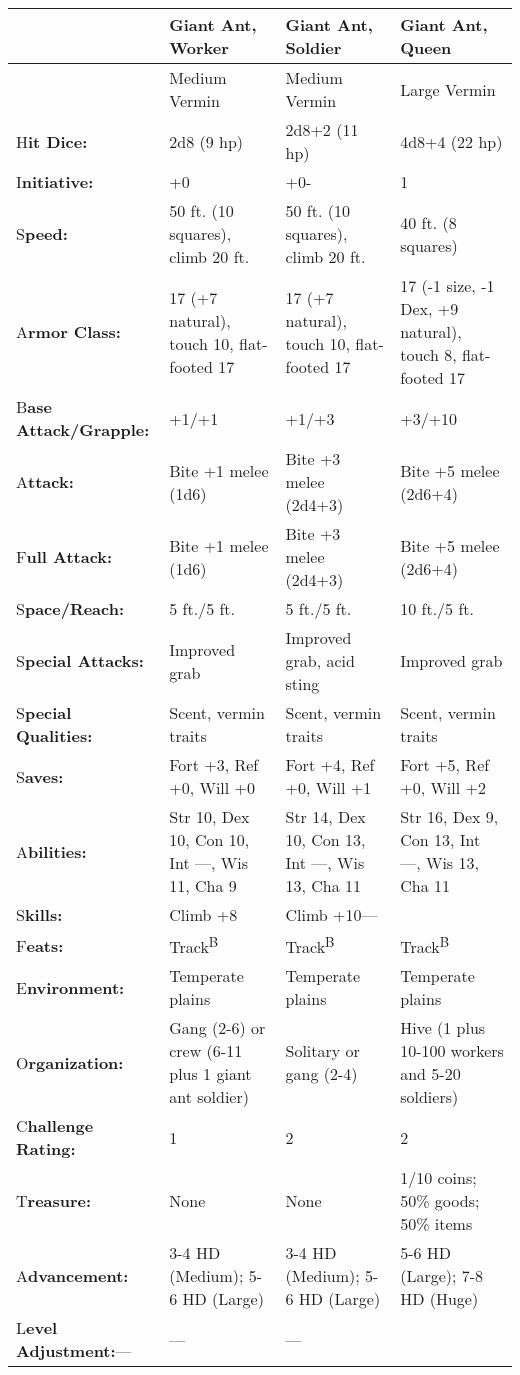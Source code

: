 \documentclass{article}
\begin{document}
\begin{tabular}{|>{\raggedright}p{54pt}|>{\raggedright}p{82pt}|>{\raggedright}p{82pt}|>{\raggedright}p{82pt}|}
\hline
  & G\textbf{iant Ant, Worker} & G\textbf{iant Ant, Soldier} & G\textbf{iant Ant, 
Queen}\tabularnewline
\hline
  & Medium Vermin & Medium Vermin & Large Vermin\tabularnewline
\hline
H\textbf{it Dice:} & 2d8 (9 hp) & 2d8+2 (11 hp) & 4d8+4 (22 hp)\tabularnewline
\hline
I\textbf{nitiative:} & +0 & +0- & 1\tabularnewline
\hline
S\textbf{peed:} & 50 ft. (10 squares), climb 20 ft. & 50 ft. (10 squares), climb 
20 ft. & 40 ft. (8 squares)\tabularnewline
\hline
A\textbf{rmor Class:} & 17 (+7 natural), touch 10, flat-footed 17 & 17 (+7 natural), 
touch 10, flat-footed 17 & 17 (-1 size, -1 Dex, +9 natural), touch 8, flat-footed 
17\tabularnewline
\hline
B\textbf{ase Attack/Grapple:} & +1/+1 & +1/+3 & +3/+10\tabularnewline
\hline
A\textbf{ttack:} & Bite +1 melee (1d6) & Bite +3 melee (2d4+3) & Bite +5 melee 
(2d6+4)\tabularnewline
\hline
F\textbf{ull Attack:} & Bite +1 melee (1d6) & Bite +3 melee (2d4+3) & Bite +5 melee 
(2d6+4)\tabularnewline
\hline
S\textbf{pace/Reach:} & 5 ft./5 ft. & 5 ft./5 ft. & 10 ft./5 ft.\tabularnewline
\hline
S\textbf{pecial Attacks:} & Improved grab & Improved grab, acid sting & Improved 
grab\tabularnewline
\hline
S\textbf{pecial Qualities:} & Scent, vermin traits & Scent, vermin traits & Scent, 
vermin traits\tabularnewline
\hline
S\textbf{aves:} & Fort +3, Ref +0, Will +0 & Fort +4, Ref +0, Will +1 & Fort +5, 
Ref +0, Will +2\tabularnewline
\hline
A\textbf{bilities:} & Str 10, Dex 10, Con 10, Int ---, Wis 11, Cha 9 & Str 14, 
Dex 10, Con 13, Int ---, Wis 13, Cha 11 & Str 16, Dex 9, Con 13, Int ---, Wis 13, 
Cha 11\tabularnewline
\hline
S\textbf{kills:} & Climb +8 & Climb +10--- & \tabularnewline
\hline
F\textbf{eats:} & Track\textsuperscript{B} & Track\textsuperscript{B} & Track\textsuperscript{B}\tabularnewline
\hline
E\textbf{nvironment:} & Temperate plains & Temperate plains & Temperate plains\tabularnewline
\hline
O\textbf{rganization:} & Gang (2-6) or crew (6-11 plus 1 giant ant soldier) & Solitary 
or gang (2-4) & Hive (1 plus 10-100 workers and 5-20 soldiers)\tabularnewline
\hline
C\textbf{hallenge Rating:} & 1 & 2 & 2\tabularnewline
\hline
T\textbf{reasure:} & None & None & 1/10 coins; 50\% goods; 50\% items\tabularnewline
\hline
A\textbf{dvancement:} & 3-4 HD (Medium); 5-6 HD (Large) & 3-4 HD (Medium); 5-6 
HD (Large) & 5-6 HD (Large); 7-8 HD (Huge)\tabularnewline
\hline
L\textbf{evel Adjustment:}--- & --- & --- & \tabularnewline
\hline
\end{tabular}
\end{document}
